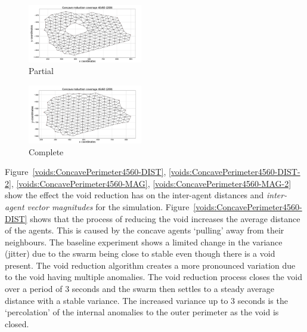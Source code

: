 \documentclass[preprint,12pt]{elsarticle}
\begin{document}
\begin{figure}
\begin{center}
\includegraphics[width=5cm]{figures/Concave4560-2}
\end{center}
\caption{Partial\label{fig:VoidConcaveReduction2}}
\end{figure}

\begin{figure}
\begin{center}
\includegraphics[width=5cm]{figures/Concave4560-3}
\end{center}
\caption{Complete\label{fig:VoidConcaveReduction3}}
\end{figure}

Figure~\ref{voids:ConcavePerimeter4560-DIST}, \ref{voids:ConcavePerimeter4560-DIST-2}, \ref{voids:ConcavePerimeter4560-MAG}, \ref{voids:ConcavePerimeter4560-MAG-2} show the effect the void reduction has on the inter-agent distances and \textit{inter-agent vector magnitudes} for the simulation. 
Figure~\ref{voids:ConcavePerimeter4560-DIST} shows that the process of reducing the void increases the average distance of the agents. This is caused by the concave agents `pulling' away from their neighbours. The baseline experiment shows a limited change in the variance (jitter) due to the swarm being close to stable even though there is a void present. 
The void reduction algorithm creates a more pronounced variation due to the void having multiple anomalies. The void reduction process closes the void over a period of 3 seconds and the swarm then settles to a steady average distance with a stable variance. The increased variance up to 3 seconds is the `percolation' of the internal anomalies to the outer perimeter as the void is closed.
\end{document}
